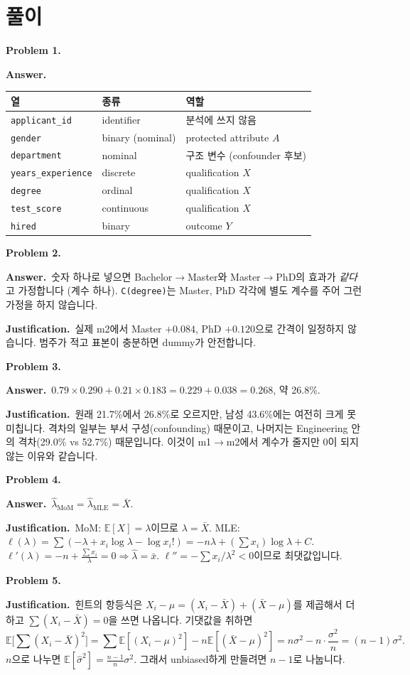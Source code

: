 \documentclass[11pt,a4paper]{article}
\newcommand{\E}{\mathbb{E}}
\newcommand{\code}[1]{\texttt{#1}}
\newcommand{\Ans}{\par\textbf{Answer.}\ }
\newcommand{\Just}{\par\textbf{Justification.}\ }
\begin{document}
\newpage
\section{풀이}

\textbf{Problem 1.}
\Ans
\begin{center}
\begin{tabular}{@{}l l l@{}}
\toprule
열 & 종류 & 역할 \\
\midrule
\code{applicant\_id} & identifier & 분석에 쓰지 않음 \\
\code{gender} & binary (nominal) & protected attribute $A$ \\
\code{department} & nominal & 구조 변수 (confounder 후보) \\
\code{years\_experience} & discrete & qualification $X$ \\
\code{degree} & ordinal & qualification $X$ \\
\code{test\_score} & continuous & qualification $X$ \\
\code{hired} & binary & outcome $Y$ \\
\bottomrule
\end{tabular}
\end{center}

\textbf{Problem 2.}
\Ans 숫자 하나로 넣으면 Bachelor$\to$Master와 Master$\to$PhD의 효과가 \emph{같다}고 가정합니다 (계수 하나). \code{C(degree)}는 Master, PhD 각각에 별도 계수를 주어 그런 가정을 하지 않습니다.
\Just 실제 m2에서 Master $+0.084$, PhD $+0.120$으로 간격이 일정하지 않습니다. 범주가 적고 표본이 충분하면 dummy가 안전합니다.

\textbf{Problem 3.}
\Ans $0.79\times0.290+0.21\times0.183=0.229+0.038=0.268$, 약 26.8\%.
\Just 원래 21.7\%에서 26.8\%로 오르지만, 남성 43.6\%에는 여전히 크게 못 미칩니다. 격차의 일부는 부서 구성(confounding) 때문이고, 나머지는 Engineering 안의 격차(29.0\% vs 52.7\%) 때문입니다. 이것이 m1$\to$m2에서 계수가 줄지만 0이 되지 않는 이유와 같습니다.

\textbf{Problem 4.}
\Ans $\hat\lambda_{\text{MoM}}=\hat\lambda_{\text{MLE}}=\bar X$.
\Just MoM: $\E[X]=\lambda$이므로 $\lambda=\bar X$. MLE: $\ell(\lambda)=\sum(-\lambda+x_i\log\lambda-\log x_i!)=-n\lambda+(\sum x_i)\log\lambda+C$. $\ell'(\lambda)=-n+\frac{\sum x_i}\lambda=0\Rightarrow\hat\lambda=\bar x$. $\ell''=-\sum x_i/\lambda^2<0$이므로 최댓값입니다.

\textbf{Problem 5.}
\Just 힌트의 항등식은 $X_i-\mu=(X_i-\bar X)+(\bar X-\mu)$를 제곱해서 더하고 $\sum(X_i-\bar X)=0$을 쓰면 나옵니다. 기댓값을 취하면
\[
\E\Big[\sum(X_i-\bar X)^2\Big]=\sum\E[(X_i-\mu)^2]-n\E[(\bar X-\mu)^2]=n\sigma^2-n\cdot\frac{\sigma^2}n=(n-1)\sigma^2.
\]
$n$으로 나누면 $\E[\hat\sigma^2]=\frac{n-1}n\sigma^2$. 그래서 unbiased하게 만들려면 $n-1$로 나눕니다.
\end{document}
